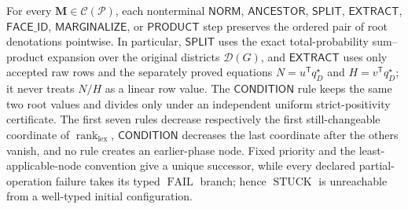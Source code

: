 For every \(\mathbf M\in\mathcal C(\mathcal P)\), each nonterminal \(\mathsf{NORM}\), \(\mathsf{ANCESTOR}\), \(\mathsf{SPLIT}\), \(\mathsf{EXTRACT}\), \(\mathsf{FACE\_ID}\), \(\mathsf{MARGINALIZE}\), or \(\mathsf{PRODUCT}\) step preserves the ordered pair of root denotations pointwise.  In particular, \(\mathsf{SPLIT}\) uses the exact total-probability sum--product expansion over the original districts \(\mathcal D(G)\), and \(\mathsf{EXTRACT}\) uses only accepted raw rows and the separately proved equations \(N=u^{\mathsf T}q_D^\star\) and \(H=v^{\mathsf T}q_D^\star\); it never treats \(N/H\) as a linear row value.  The \(\mathsf{CONDITION}\) rule keeps the same two root values and divides only under an independent uniform strict-positivity certificate.  The first seven rules decrease respectively the first still-changeable coordinate of \(\operatorname{rank}_{\mathrm{lex}}\), \(\mathsf{CONDITION}\) decreases the last coordinate after the others vanish, and no rule creates an earlier-phase node.  Fixed priority and the least-applicable-node convention give a unique successor, while every declared partial-operation failure takes its typed \(\operatorname{FAIL}\) branch; hence \(\operatorname{STUCK}\) is unreachable from a well-typed initial configuration.